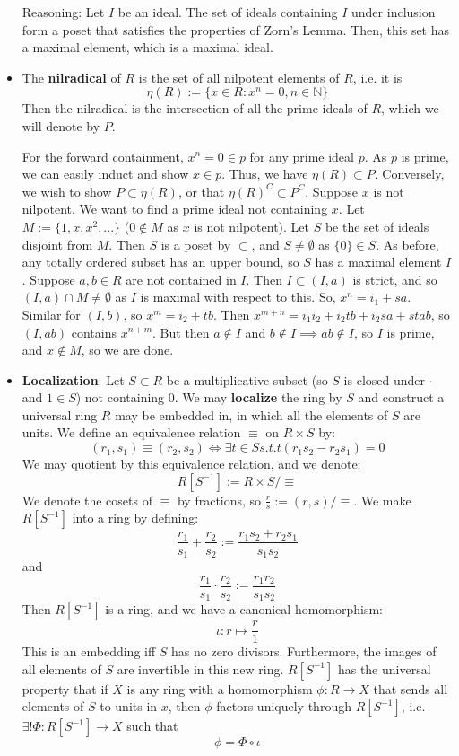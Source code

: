 \documentclass[11pt, oneside]{amsart}   	%
\theoremstyle{definition}
\begin{document}
\begin{itemize}
	Reasoning: Let $I$ be an ideal. The set of ideals containing $I$ under inclusion form a poset that satisfies the properties of Zorn's Lemma. Then, 
	this set has a maximal element, which is a maximal ideal.
	
	\item The \textbf{nilradical} of $R$ is the set of all nilpotent elements of $R$, i.e. it is 
	$$
		\eta(R) := \{x\in R : x^n = 0, n\in \mathbb N\}
	$$
	Then the nilradical is the intersection of all the prime ideals of $R$, which we will denote by $P$.
	
	For the forward containment, $x^n = 0\in p$ for any prime ideal $p$. As $p$ is prime, we can easily induct and show $x\in p$. Thus, we have $
	\eta(R)\subset P$. Conversely, we wish to show $P\subset \eta(R)$, or that $\eta(R)^C\subset P^C$. Suppose $x$ is not nilpotent. We want to 
	find a prime ideal not containing $x$. Let $M := \{1, x, x^2, ...\}$ ($0\not\in M$ as $x$ is not nilpotent). Let $S$ be the set of ideals disjoint from 
	$M$. Then $S$ is a poset by $\subset$, and $S\neq \emptyset$ as $\{0\}\in S$. As before, any totally ordered subset has an upper bound, so $S$ 
	has a maximal element $I$. Suppose $a, b\in R$ are not contained in $I$. Then $I\subset (I, a)$ is strict, and so $(I, a)\cap M \neq \emptyset$ as 
	$I$ is maximal with respect to this. So, $x^n = i_1 + sa$. Similar for $(I, b)$, so $x^m = i_2 + tb$. Then $x^{m + n} = i_1i_2 + i_2tb + i_2sa + stab
	$, so $(I, ab)$ contains $x^{n + m}$. But then $a\not\in I$ and $b\not\in I\implies ab\not\in I$, so $I$ is prime, and $x\not\in M$, so we are done.
	
	\item \textbf{Localization}: Let $S\subset R$ be a multiplicative subset (so $S$ is closed under $\cdot$ and $1\in S$) not containing $0$. We may 
	\textbf{localize} the ring by $S$ and construct a universal ring $R$ may be embedded in, in which all the elements of $S$ are units. We define 
	an equivalence relation $\equiv$ on $R\times S$ by:
	$$
		(r_1, s_1) \equiv (r_2, s_2) \iff \exists t\in S s.t. t(r_1s_2 - r_2s_1) = 0
	$$
	We may quotient by this equivalence relation, and we denote:
	$$
		R[S^{-1}] := R\times S / \equiv
	$$
	We denote the cosets of $\equiv$ by fractions, so $\frac{r}{s} := (r, s)/\equiv$. We make $R[S^{-1}]$ into a ring by defining:
	$$
		\frac{r_1}{s_1} + \frac{r_2}{s_2} := \frac{r_1s_2 + r_2s_1}{s_1s_2}
	$$
	and
	$$
		\frac{r_1}{s_1}\cdot\frac{r_2}{s_2} := \frac{r_1r_2}{s_1s_2}
	$$
	Then $R[S^{-1}]$ is a ring, and we have a canonical homomorphism:
	$$
		\iota: r\mapsto \frac{r}{1}
	$$
	This is an embedding iff $S$ has no zero divisors. Furthermore, the images of all elements of $S$ are invertible in this new ring. $R[S^{-1}]$ has 
	the universal property that if $X$ is any ring with a homomorphism $\phi: R\rightarrow X$ that sends all elements of $S$ to units in $x$, then 
	$\phi$ factors uniquely through $R[S^{-1}]$, i.e. $\exists !\Phi : R[S^{-1}]\rightarrow X$ such that 
	$$
		\phi = \Phi\circ\iota
	$$
	

\end{itemize}
\end{document}
